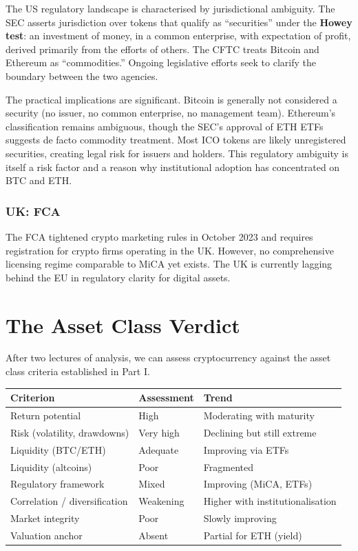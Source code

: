 \documentclass[11pt,a4paper]{article}
\newcommand{\keyword}[1]{\textbf{\textcolor{AccentOrange}{#1}}}
\begin{document}
The US regulatory landscape is characterised by jurisdictional ambiguity. The SEC asserts jurisdiction over tokens that qualify as ``securities'' under the \keyword{Howey test}: an investment of money, in a common enterprise, with expectation of profit, derived primarily from the efforts of others. The CFTC treats Bitcoin and Ethereum as ``commodities.'' Ongoing legislative efforts seek to clarify the boundary between the two agencies.

The practical implications are significant. Bitcoin is generally not considered a security (no issuer, no common enterprise, no management team). Ethereum's classification remains ambiguous, though the SEC's approval of ETH ETFs suggests de facto commodity treatment. Most ICO tokens are likely unregistered securities, creating legal risk for issuers and holders. This regulatory ambiguity is itself a risk factor and a reason why institutional adoption has concentrated on BTC and ETH.

\subsubsection{UK: FCA}

The FCA tightened crypto marketing rules in October 2023 and requires registration for crypto firms operating in the UK. However, no comprehensive licensing regime comparable to MiCA yet exists. The UK is currently lagging behind the EU in regulatory clarity for digital assets.

\section{The Asset Class Verdict}

After two lectures of analysis, we can assess cryptocurrency against the asset class criteria established in Part I.

\begin{center}
\begin{tabular}{lll}
\toprule
\textbf{Criterion} & \textbf{Assessment} & \textbf{Trend} \\
\midrule
Return potential & High & Moderating with maturity \\
Risk (volatility, drawdowns) & Very high & Declining but still extreme \\
Liquidity (BTC/ETH) & Adequate & Improving via ETFs \\
Liquidity (altcoins) & Poor & Fragmented \\
Regulatory framework & Mixed & Improving (MiCA, ETFs) \\
Correlation / diversification & Weakening & Higher with institutionalisation \\
Market integrity & Poor & Slowly improving \\
Valuation anchor & Absent & Partial for ETH (yield) \\
\bottomrule
\end{tabular}
\end{center}
\end{document}
